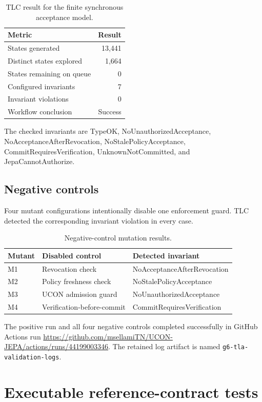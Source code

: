 \documentclass[11pt,a4paper]{article}
\theoremstyle{remark}
\begin{document}
\begin{table}[h]
\centering
\begin{tabular}{lr}
\toprule
Metric & Result\\
\midrule
States generated & 13,441\\
Distinct states explored & 1,664\\
States remaining on queue & 0\\
Configured invariants & 7\\
Invariant violations & 0\\
Workflow conclusion & Success\\
\bottomrule
\end{tabular}
\caption{TLC result for the finite synchronous acceptance model.}
\end{table}

The checked invariants are TypeOK, NoUnauthorizedAcceptance, NoAcceptanceAfterRevocation, NoStalePolicyAcceptance, CommitRequiresVerification, UnknownNotCommitted, and JepaCannotAuthorize.

\subsection{Negative controls}

Four mutant configurations intentionally disable one enforcement guard. TLC detected the corresponding invariant violation in every case.

\begin{table}[h]
\centering
\begin{tabular}{lll}
\toprule
Mutant & Disabled control & Detected invariant\\
\midrule
M1 & Revocation check & NoAcceptanceAfterRevocation\\
M2 & Policy freshness check & NoStalePolicyAcceptance\\
M3 & UCON admission guard & NoUnauthorizedAcceptance\\
M4 & Verification-before-commit & CommitRequiresVerification\\
\bottomrule
\end{tabular}
\caption{Negative-control mutation results.}
\end{table}

The positive run and all four negative controls completed successfully in GitHub Actions run \url{https://github.com/msellamiTN/UCON-JEPA/actions/runs/44199003346}. The retained log artifact is named \texttt{g6-tla-validation-logs}.

\section{Executable reference-contract tests}
\end{document}
